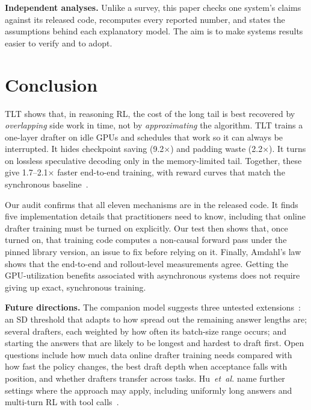 \documentclass[conference]{IEEEtran}
\newcommand{\x}{\ensuremath{\times}}
\begin{document}
\textbf{Independent analyses.} Unlike a survey, this paper checks one system's claims against its released code, recomputes every reported number, and states the assumptions behind each explanatory model. The aim is to make systems results easier to verify and to adopt.

\section{Conclusion}
\label{sec:conclusion}

TLT shows that, in reasoning RL, the cost of the long tail is best recovered by \emph{overlapping} side work in time, not by \emph{approximating} the algorithm. TLT trains a one-layer drafter on idle GPUs and schedules that work so it can always be interrupted. It hides checkpoint saving (9.2\x) and padding waste (2.2\x). It turns on lossless speculative decoding only in the memory-limited tail. Together, these give 1.7--2.1\x{} faster end-to-end training, with reward curves that match the synchronous baseline~\cite{hu2026tlt}.

Our audit confirms that all eleven mechanisms are in the released code. It finds five implementation details that practitioners need to know, including that online drafter training must be turned on explicitly. Our test then shows that, once turned on, that training code computes a non-causal forward pass under the pinned library version, an issue to fix before relying on it. Finally, Amdahl's law shows that the end-to-end and rollout-level measurements agree. Getting the GPU-utilization benefits associated with asynchronous systems does not require giving up exact, synchronous training.

\textbf{Future directions.} The companion model suggests three untested extensions~\cite{hibbs2026dashboard}: an SD threshold that adapts to how spread out the remaining answer lengths are; several drafters, each weighted by how often its batch-size range occurs; and starting the answers that are likely to be longest and hardest to draft first. Open questions include how much data online drafter training needs compared with how fast the policy changes, the best draft depth when acceptance falls with position, and whether drafters transfer across tasks. Hu~\emph{et~al.} name further settings where the approach may apply, including uniformly long answers and multi-turn RL with tool calls~\cite[Sec.~7]{hu2026tlt}.
\end{document}
